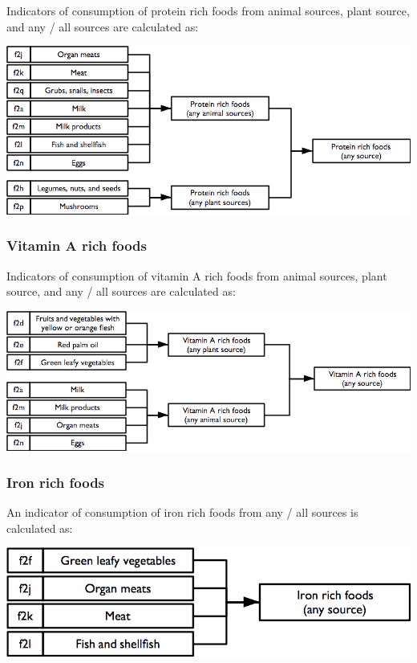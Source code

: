 \documentclass[12pt,a4paper]{book}
\theoremstyle{definition}
\theoremstyle{definition}
\theoremstyle{definition}
\theoremstyle{remark}
\begin{document}
Indicators of consumption of protein rich foods from animal sources,
plant source, and any / all sources are calculated as:

\begin{center}\includegraphics{figures/indicators09} \end{center}

\hypertarget{vitamin-a-rich-foods}{%
\subsubsection{Vitamin A rich foods}\label{vitamin-a-rich-foods}}

Indicators of consumption of vitamin A rich foods from animal sources,
plant source, and any / all sources are calculated as:

\begin{center}\includegraphics{figures/indicators10} \end{center}

\hypertarget{iron-rich-foods}{%
\subsubsection{Iron rich foods}\label{iron-rich-foods}}

An indicator of consumption of iron rich foods from any / all sources is
calculated as:

\begin{center}\includegraphics{figures/indicators11} \end{center}
\end{document}
